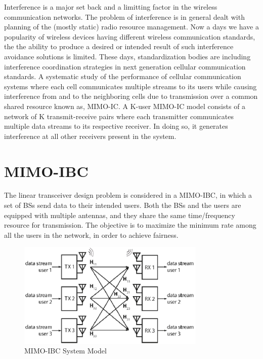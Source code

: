 \documentclass[a4paper, 12pt,titlepage]{dithesis} %
\begin{document}
Interference is a major set back and a limitting factor in the wireless communication networks. The problem of interference is in general  dealt  with  planning of the  (mostly  static) radio resource management. Now a days we have a popularity of wireless  devices  having  different  wireless  communication standards, the the ability to produce a desired or intended result of such interference avoidance solutions is limited. These days, standardization bodies are including  interference coordination strategies in  next generation  cellular  communication standards.  A  systematic study  of  the  performance of  cellular  communication systems where  each  cell  communicates  multiple  streams to  its  users while causing interference from and to the neighboring cells due  to  transmission  over  a  common  shared  resource  known as, \ac{MIMO}-\ac{IC}. A K-user \ac{MIMO}-\ac{IC} model consists of a network of K transmit-receive  pairs  where each transmitter  communicates  multiple data streams to its respective receiver. In doing so, it generates interference at all other receivers present in the system.






\section{MIMO-IBC}

The linear transceiver design problem is considered in a \ac{MIMO}-\ac{IBC}, in which a set of \ac{BS}s send data to their intended users. Both the \ac{BS}s and the users are equipped with multiple antennas, and they share the same time/frequency resource for transmission. The objective is to maximize the minimum rate among all the users in the network, in order to achieve fairness.

\begin{figure}[h]
	\begin{center}
		\includegraphics[width= 0.8\textwidth]{mimoibc.eps}
		\caption{MIMO-IBC System Model}
	\end{center}
\end{figure}
\end{document}
